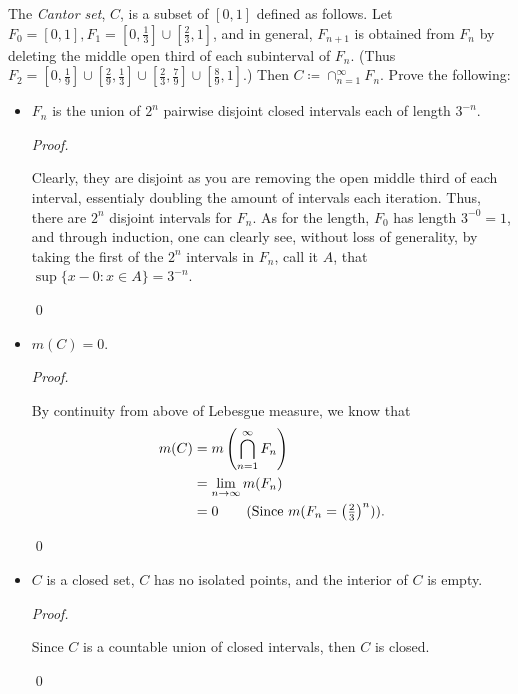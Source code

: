 \documentclass[12pt]{article}
\newenvironment{problem}[2][Problem]{\begin{trivlist}
\item[\hskip \labelsep {\bfseries #1}\hskip \labelsep {\bfseries
#2.}]}{\end{trivlist}}
\newenvironment{sol}
    {\emph{Proof.}
    }
    {
    \qed
    }
\begin{document}
\begin{problem}{40}
  The \textit{Cantor set}, $C$, is a subset of $[0,1]$ defined as follows. Let $F_0 = [0,1], F_1 = [0,\frac{1}{3}]\cup[\frac{2}{3},1]$, and in general, $F_{n+1}$ is obtained from $F_n$ by deleting the middle open third of each subinterval of $F_n$. (Thus $F_2 = [0,\frac{1}{9}]\cup[\frac{2}{9},\frac{1}{3}]\cup[\frac{2}{3},\frac{7}{9}]\cup[\frac{8}{9},1]$.) Then $C \coloneqq \cap_{n = 1}^{\infty}F_n$. Prove the following:
  \begin{itemize}
    \item[(a)] $F_n$ is the union of $2^n$ pairwise disjoint closed intervals each of length $3^{-n}$.
     
    \begin{sol}
      Clearly, they are disjoint as you are removing the open middle third of each interval, essentialy doubling the amount of intervals each iteration. Thus, there are $2^n$ disjoint intervals for $F_n$. As for the length, $F_0$ has length $3^{-0} = 1$, and through induction, one can clearly see, without loss of generality, by taking the first of the $2^n$ intervals in $F_n$, call it $A$, that $\sup\{x - 0 : x \in A\} = 3^{-n}$.
    \end{sol}

    \item[(b)] $m(C) = 0$.
    
    \begin{sol}
      By continuity from above of Lebesgue measure, we know that 
      \begin{align*}
        m(C) &= m\left(\bigcap_{n = 1}^{\infty}F_n\right) \\
        &= \lim_{n \to \infty} m(F_n) \\
        &= 0 \tag*{(Since $m(F_n = \left(\frac{2}{3} \right)^n)$)}.
      \end{align*}
    \end{sol}

    \item[(c)] $C$ is a closed set, $C$ has no isolated points, and the interior of $C$ is empty.  
    
    \begin{sol}
      Since $C$ is a countable union of closed intervals, then $C$ is closed.
    \end{sol}
  \end{itemize}
\end{problem}

\end{document}
